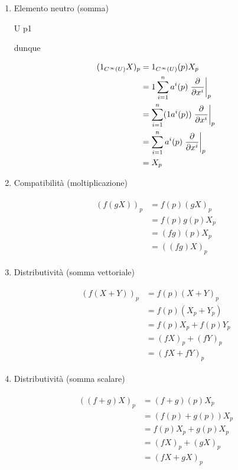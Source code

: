 \begin{enumerate}
	\item Elemento neutro (somma)
	
		{U}{\R}
		{p}{1}
	
	dunque
	
	\begin{align}
		\begin{split}
			(1_{C^{\infty}(U)} X)_{p} &= 1_{C^{\infty}(U)} (p) X_{p}\\
			&= 1 \sum_{i=1}^{n} a^{i} (p) \eval{ \pdv{x^{i}} }_{p}\\
			&= \sum_{i=1}^{n} (1 a^{i} (p)) \eval{ \pdv{x^{i}} }_{p}\\
			&= \sum_{i=1}^{n} a^{i} (p) \eval{ \pdv{x^{i}} }_{p}\\
			&= X_{p}
		\end{split}
	\end{align}
	
	\item Compatibilità (moltiplicazione)
	
	\begin{align}
		\begin{split}
			(f (g X))_{p} &= f (p) (g X)_{p}\\
			&= f (p) g (p) X_{p}\\
			&= (f g) (p) X_{p}\\
			&= ((f g) X)_{p}
		\end{split}
	\end{align}
	
	\item Distributività (somma vettoriale)
	
	\begin{align}
		\begin{split}
			(f (X + Y))_{p} &= f (p) (X + Y)_{p}\\
			&= f (p) (X_{p} + Y_{p})\\
			&= f (p) X_{p} + f (p) Y_{p}\\
			&= (f X)_{p} + (f Y)_{p}\\
			&= (f X + f Y)_{p}
		\end{split}
	\end{align}
	
	\item Distributività (somma scalare)
	
	\begin{align}
		\begin{split}
			((f + g) X)_{p} &= (f + g) (p) X_{p}\\
			&= (f (p) + g (p)) X_{p}\\
			&= f (p) X_{p} + g (p) X_{p}\\
			&= (f X)_{p} + (g X)_{p}\\
			&= (f X + g X)_{p}
		\end{split}
	\end{align}
\end{enumerate}

